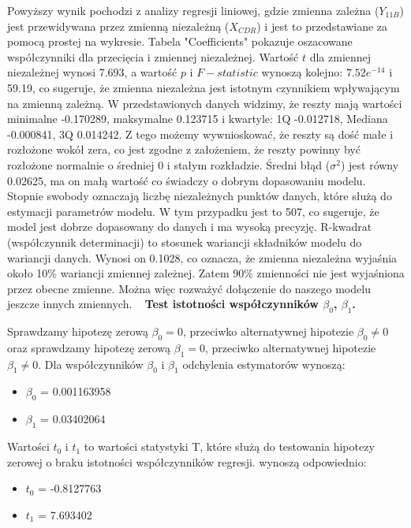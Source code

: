 \documentclass[a4paper,11pt]{article}
\def\\{\hfill\break}
\begin{document}
\\
Powyższy wynik pochodzi z analizy regresji liniowej, gdzie zmienna zależna ($Y_{11B}$) jest przewidywana przez zmienną niezależną ($X_{CDR}$) i jest to przedstawiane za pomocą prostej na wykresie. 
\\\\
Tabela "Coefficients" pokazuje oszacowane współczynniki dla przecięcia i zmiennej niezależnej. Wartość $t$ dla zmiennej niezależnej wynosi 7.693, a wartość $p$ i $F-statistic$ wynoszą kolejno: $7.52e^{-14}$ i 59.19, co sugeruje, że zmienna niezależna jest istotnym czynnikiem wpływającym na zmienną zależną.
\\
\\
W przedstawionych danych widzimy, że reszty mają wartości minimalne -0.170289, maksymalne 0.123715 i kwartyle: 1Q -0.012718, Mediana -0.000841, 3Q 0.014242. Z tego możemy wywnioskować, że reszty są dość małe i rozłożone wokół zera, co jest zgodne z założeniem, że reszty powinny być rozłożone normalnie o średniej 0 i stałym rozkładzie. 
\\\\
Średni błąd ($\sigma^2$)  jest równy 0.02625, ma on małą wartość co świadczy o dobrym dopasowaniu modelu. 
Stopnie swobody oznaczają liczbę niezależnych punktów danych, które służą do estymacji parametrów modelu. W tym przypadku jest to 507, co sugeruje, że model jest dobrze dopasowany do danych i ma wysoką precyzję.
\\
\\
R-kwadrat (współczynnik determinacji) to stosunek wariancji składników modelu do wariancji danych. Wynosi on 0.1028, co oznacza, że zmienna niezależna wyjaśnia około 10\% wariancji zmiennej zależnej. Zatem 90\% zmienności  nie jest wyjaśniona przez obecne zmienne. Można więc rozważyć dołączenie do naszego
modelu jeszcze innych zmiennych.
\\\
\\
\textbf{Test istotności współczynników $\beta_0$, $\beta_1$.}
\\

Sprawdzamy hipotezę zerową $\beta_0=0$, przeciwko alternatywnej hipotezie $\beta_0\neq0$ oraz sprawdzamy hipotezę zerową $\beta_1=0$, przeciwko alternatywnej hipotezie $\beta_1\neq0$.
\\\\
Dla współczynników $\beta_0$ i $\beta_1$ odchylenia estymatorów wynoszą:
\begin{itemize}
\item $\beta_0$ = 0.001163958
\item $\beta_1$ = 0.03402064
\end{itemize} 
\\
Wartości $t_0$ i $t_1$ to wartości statystyki T, które służą do testowania hipotezy zerowej o braku istotności współczynników regresji. wynoszą odpowiednio:
\begin{itemize}
\item $t_0$ = -0.8127763
\item $t_1$ = 7.693402
\end{itemize} 
\end{document}
